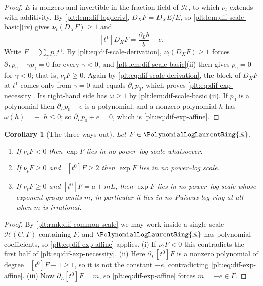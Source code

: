 \documentclass[11pt,oneside]{article}
\theoremstyle{plain}
\newtheorem{corollary}[theorem]{Corollary}
\theoremstyle{definition}
\theoremstyle{remark}
\newcommand{\K}{\mathbb{K}}
\newcommand{\PLlau}{\PolynomialLogLaurentRing{\K}}       %
\newcommand{\ordt}{\nu_{t}}                              %
\DeclareMathOperator{\degL}{deg_{L}}
\newcommand{\DX}{D_{X}}                                  %
\begin{document}
\begin{proof}
\(E\) is nonzero and invertible in the fraction field of \(\mathcal H\), to
which \(\ordt\) extends with additivity.  By \cref{plt:lem:dif-logderiv},
\(\DX F=\DX E/E\), so \cref{plt:lem:dif-scale-basic}(iv) gives
\(\ordt(\DX F)\ge1\) and
\[
  [t^{1}]\DX F=\frac{\partial_{L}b}{b}-e .
\]
Write \(F=\sum_{\gamma}p_{\gamma}t^{\gamma}\).  By
\cref{plt:eq:dif-scale-derivation}, \(\ordt(\DX F)\ge1\) forces
\(\partial_{L}p_{\gamma}-\gamma p_{\gamma}=0\) for every \(\gamma<0\), and
\cref{plt:lem:dif-scale-basic}(ii) then gives \(p_{\gamma}=0\) for
\(\gamma<0\); that is, \(\ordt F\ge0\).  Again by
\cref{plt:eq:dif-scale-derivation}, the block of \(\DX F\) at \(t^{1}\) comes
only from \(\gamma=0\) and equals \(\partial_{L}p_{0}\), which proves
\cref{plt:eq:dif-exp-necessity}.  Its right-hand side has \(\omega\ge1\) by
\cref{plt:lem:dif-scale-basic}(ii).  If \(p_{0}\) is a polynomial then
\(\partial_{L}p_{0}+e\) is a polynomial, and a nonzero polynomial \(h\) has
\(\omega(h)=-\degL h\le0\); so \(\partial_{L}p_{0}+e=0\), which is
\cref{plt:eq:dif-exp-affine}.
\end{proof}

\begin{corollary}[The three ways out]\label{plt:cor:dif-exp-three-ways}
Let \(F\in\PLlau\).
\begin{enumerate}
\item If \(\ordt F<0\) then \(\exp F\) lies in \emph{no} power--log scale
      whatsoever.
\item If \(\ordt F\ge0\) and \(\degL[t^{0}]F\ge2\) then \(\exp F\) lies in no
      power--log scale.
\item If \(\ordt F\ge0\) and \([t^{0}]F=a+mL\), then \(\exp F\) lies in no
      power--log scale whose exponent group omits \(m\); in particular it lies
      in no Puiseux-log ring at all when \(m\) is irrational.
\end{enumerate}
\end{corollary}

\begin{proof}
By \cref{plt:rmk:dif-common-scale} we may work inside a single scale
\(\mathcal H(C,\Gamma)\) containing \(F\), and \(\PLlau\) has polynomial
coefficients, so \cref{plt:eq:dif-exp-affine} applies.  (i) If \(\ordt F<0\)
this contradicts the first half of \cref{plt:eq:dif-exp-necessity}.  (ii) Here
\(\partial_{L}[t^{0}]F\) is a nonzero polynomial of degree
\(\degL[t^{0}]F-1\ge1\), so it is not the constant \(-e\), contradicting
\cref{plt:eq:dif-exp-affine}.  (iii) Now \(\partial_{L}[t^{0}]F=m\), so
\cref{plt:eq:dif-exp-affine} forces \(m=-e\in\Gamma\).
\end{proof}
\end{document}
